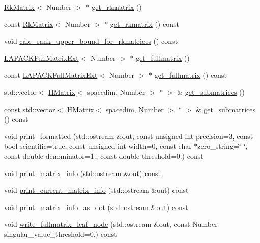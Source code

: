 \begin{DoxyCompactItemize}
\item 
\hyperlink{classRkMatrix}{Rk\+Matrix}$<$ Number $>$ $\ast$ \hyperlink{classHMatrix_a0189de6e276fbd3425c4a7ef132f5e16}{get\+\_\+rkmatrix} ()
\item 
const \hyperlink{classRkMatrix}{Rk\+Matrix}$<$ Number $>$ $\ast$ \hyperlink{classHMatrix_a64c81db6357d0e00b82fd523af001ae5}{get\+\_\+rkmatrix} () const
\item 
void \hyperlink{classHMatrix_a72191c447afaa0fd84505022cf1d174e}{calc\+\_\+rank\+\_\+upper\+\_\+bound\+\_\+for\+\_\+rkmatrices} () const
\item 
\hyperlink{classLAPACKFullMatrixExt}{L\+A\+P\+A\+C\+K\+Full\+Matrix\+Ext}$<$ Number $>$ $\ast$ \hyperlink{classHMatrix_a9d914c27d4e990d476a4529b2daa64cd}{get\+\_\+fullmatrix} ()
\item 
const \hyperlink{classLAPACKFullMatrixExt}{L\+A\+P\+A\+C\+K\+Full\+Matrix\+Ext}$<$ Number $>$ $\ast$ \hyperlink{classHMatrix_aed550b5b41a64c6f1bbcde4f8f7eca91}{get\+\_\+fullmatrix} () const
\item 
std\+::vector$<$ \hyperlink{classHMatrix}{H\+Matrix}$<$ spacedim, Number $>$ $\ast$ $>$ \& \hyperlink{classHMatrix_a0572b2c0484ce618db0034e3bc7988ed}{get\+\_\+submatrices} ()
\item 
const std\+::vector$<$ \hyperlink{classHMatrix}{H\+Matrix}$<$ spacedim, Number $>$ $\ast$ $>$ \& \hyperlink{classHMatrix_a8f8e9bc437ab86296d78950081ea34cd}{get\+\_\+submatrices} () const
\item 
void \hyperlink{classHMatrix_a7e849f7e8f35e3ebdfcb2dbb7ad4ad01}{print\+\_\+formatted} (std\+::ostream \&out, const unsigned int precision=3, const bool scientific=true, const unsigned int width=0, const char $\ast$zero\+\_\+string=\char`\"{} \char`\"{}, const double denominator=1., const double threshold=0.) const
\item 
void \hyperlink{classHMatrix_ad8f87883cf49080706233441c0e09171}{print\+\_\+matrix\+\_\+info} (std\+::ostream \&out) const
\item 
void \hyperlink{classHMatrix_aab0c393acf1c416ebc7ab05ca85d9e49}{print\+\_\+current\+\_\+matrix\+\_\+info} (std\+::ostream \&out) const
\item 
void \hyperlink{classHMatrix_ae904288a7e0ac82d9fd2364b1c150bc2}{print\+\_\+matrix\+\_\+info\+\_\+as\+\_\+dot} (std\+::ostream \&out) const
\item 
void \hyperlink{classHMatrix_a42f958a13c56d64564d59487e67bc8a2}{write\+\_\+fullmatrix\+\_\+leaf\+\_\+node} (std\+::ostream \&out, const Number singular\+\_\+value\+\_\+threshold=0.) const

\end{DoxyCompactItemize}
